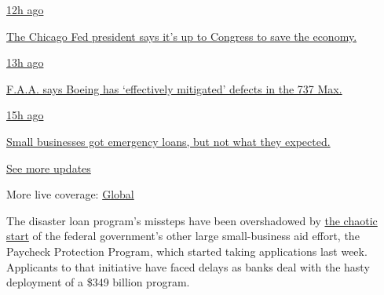 \href{https://www.nytimes3xbfgragh.onion/live/2020/08/03/business/stock-market-today-coronavirus?action=click\&pgtype=Article\&state=default\&region=MAIN_CONTENT_1\&context=storylines_live_updates\#the-chicago-fed-president-says-its-up-to-congress-to-save-the-economy}{12h
ago}

\href{https://www.nytimes3xbfgragh.onion/live/2020/08/03/business/stock-market-today-coronavirus?action=click\&pgtype=Article\&state=default\&region=MAIN_CONTENT_1\&context=storylines_live_updates\#the-chicago-fed-president-says-its-up-to-congress-to-save-the-economy}{The
Chicago Fed president says it's up to Congress to save the economy.}

\href{https://www.nytimes3xbfgragh.onion/live/2020/08/03/business/stock-market-today-coronavirus?action=click\&pgtype=Article\&state=default\&region=MAIN_CONTENT_1\&context=storylines_live_updates\#faa-says-boeing-has-effectively-mitigated-defects-in-the-737-max}{13h
ago}

\href{https://www.nytimes3xbfgragh.onion/live/2020/08/03/business/stock-market-today-coronavirus?action=click\&pgtype=Article\&state=default\&region=MAIN_CONTENT_1\&context=storylines_live_updates\#faa-says-boeing-has-effectively-mitigated-defects-in-the-737-max}{F.A.A.
says Boeing has `effectively mitigated' defects in the 737 Max.}

\href{https://www.nytimes3xbfgragh.onion/live/2020/08/03/business/stock-market-today-coronavirus?action=click\&pgtype=Article\&state=default\&region=MAIN_CONTENT_1\&context=storylines_live_updates\#small-businesses-got-emergency-loans-but-not-what-they-expected}{15h
ago}

\href{https://www.nytimes3xbfgragh.onion/live/2020/08/03/business/stock-market-today-coronavirus?action=click\&pgtype=Article\&state=default\&region=MAIN_CONTENT_1\&context=storylines_live_updates\#small-businesses-got-emergency-loans-but-not-what-they-expected}{Small
businesses got emergency loans, but not what they expected.}

\href{https://www.nytimes3xbfgragh.onion/live/2020/08/03/business/stock-market-today-coronavirus?action=click\&pgtype=Article\&state=default\&region=MAIN_CONTENT_1\&context=storylines_live_updates}{See
more updates}

More live coverage:
\href{https://www.nytimes3xbfgragh.onion/2020/08/03/world/coronavirus-covid-19.html?action=click\&pgtype=Article\&state=default\&region=MAIN_CONTENT_1\&context=storylines_live_updates}{Global}

The disaster loan program's missteps have been overshadowed by
\href{https://www.nytimes3xbfgragh.onion/2020/04/07/business/coronavirus-ppp-small-business-aid.html}{the
chaotic start} of the federal government's other large small-business
aid effort, the Paycheck Protection Program, which started taking
applications last week. Applicants to that initiative have faced delays
as banks deal with the hasty deployment of a \$349 billion program.

